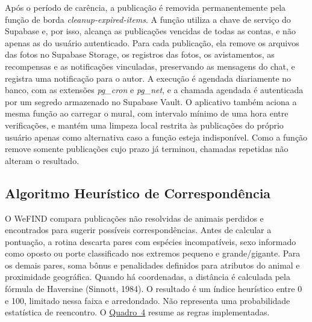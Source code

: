 Após o período de carência, a publicação é removida permanentemente pela função de borda \textit{cleanup-expired-items}. A função utiliza a chave de serviço do Supabase e, por isso, alcança as publicações vencidas de todas as contas, e não apenas as do usuário autenticado. Para cada publicação, ela remove os arquivos das fotos no Supabase Storage, os registros das fotos, os avistamentos, as recompensas e as notificações vinculadas, preservando as mensagens do chat, e registra uma notificação para o autor. A execução é agendada diariamente no banco, com as extensões \textit{pg\_cron} e \textit{pg\_net}, e a chamada agendada é autenticada por um segredo armazenado no Supabase Vault. O aplicativo também aciona a mesma função ao carregar o mural, com intervalo mínimo de uma hora entre verificações, e mantém uma limpeza local restrita às publicações do próprio usuário apenas como alternativa caso a função esteja indisponível. Como a função remove somente publicações cujo prazo já terminou, chamadas repetidas não alteram o resultado.

\subsection{Algoritmo Heurístico de Correspondência}

O WeFIND compara publicações não resolvidas de animais perdidos e encontrados para sugerir possíveis correspondências. Antes de calcular a pontuação, a rotina descarta pares com espécies incompatíveis, sexo informado como oposto ou porte classificado nos extremos pequeno e grande/gigante. Para os demais pares, soma bônus e penalidades definidos para atributos do animal e proximidade geográfica. Quando há coordenadas, a distância é calculada pela fórmula de Haversine (Sinnott, 1984). O resultado é um índice heurístico entre 0 e 100, limitado nessa faixa e arredondado. Não representa uma probabilidade estatística de reencontro. O \hyperlink{quadro:matching}{Quadro~4} resume as regras implementadas.

